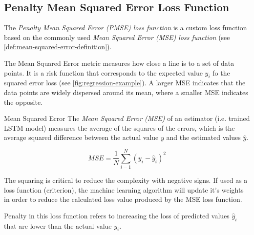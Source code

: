   \subsection{Penalty Mean Squared Error Loss Function}
  \label{sec:penalty-mse-loss-function-architecture-and-implementation}

    The \emph{Penalty Mean Squared Error (PMSE) loss function} is a custom loss function based on the commonly used \emph{Mean Squared Error (MSE) loss function} \cite{koksoyMultiresponseRobustDesign2006} (see \ref{def:mean-squared-error-definition}). 
    
    The Mean Squared Error metric measures how close a  line is to a set of data points. It is a risk function that corresponds to the expected value $y_i$ fo the squared error loss (see \ref{fig:regression-example}). A larger MSE indicates that the data points are widely dispersed around its mean, where a smaller MSE indicates the opposite.

    \begin{pabox}{Mean Squared Error}
    \label{def:mean-squared-error-definition}
      The \emph{Mean Squared Error (MSE)} of an estimator (i.e. trained LSTM model) measures the average of the squares of the errors, which is the average squared difference between the actual value $y$ and the estimated values $\hat{y}$.

      $$MSE = \frac{1}{N} \sum_{i = 1}^{N}\left(y_i - \hat{y}_i\right)^2$$

      The squaring is critical to reduce the complexity with negative signs. If used as a loss function (criterion), the machine learning algorithm will update it's weights in order to reduce the calculated loss value produced by the MSE loss function.
    \end{pabox}

    Penalty in this loss function refers to increasing the loss of predicted values $\hat{y}_i$ that are lower than the actual value $y_i$.

